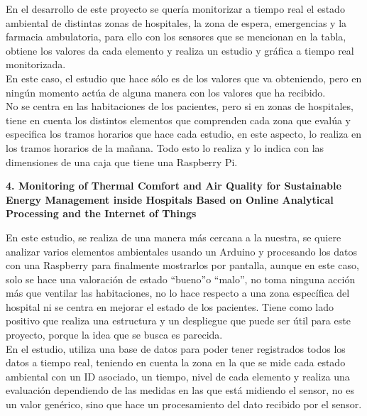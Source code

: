 En el desarrollo de este proyecto se quería monitorizar a tiempo real el estado ambiental de distintas zonas de hospitales, la zona de espera, emergencias y la farmacia ambulatoria, para ello con los sensores que se mencionan en la tabla, obtiene los valores da cada elemento y realiza un estudio y gráfica a tiempo real monitorizada. \\En este caso, el estudio que hace sólo es de los valores que va obteniendo, pero en ningún momento actúa de alguna manera con los valores que ha recibido. \\No se centra en las habitaciones de los pacientes, pero si en zonas de hospitales, tiene en cuenta los distintos elementos que comprenden cada zona que evalúa y especifica los tramos horarios que hace cada estudio, en este aspecto, lo realiza en los tramos horarios de la mañana. Todo esto lo realiza y lo indica con las dimensiones de una caja que tiene una Raspberry Pi.


\vskip 0.2in
{{\large \textbf{4. Monitoring of Thermal Comfort and Air Quality for Sustainable Energy Management inside Hospitals Based on Online Analytical Processing and the Internet of Things \cite{ijerph191912207}}}} 
\vskip 0.1in

En este estudio, se realiza de una manera más cercana a la nuestra, se quiere analizar varios elementos ambientales usando un Arduino y procesando los datos con una Raspberry para finalmente mostrarlos por pantalla, aunque en este caso, solo se hace una valoración de estado “bueno”o “malo”, no toma ninguna acción más que ventilar las habitaciones, no lo hace respecto a una zona específica del hospital ni se centra en mejorar el estado de los pacientes. Tiene como lado positivo que realiza una estructura y un despliegue que puede ser útil para este proyecto, porque la idea que se busca es parecida.\\ En el estudio, utiliza una base de datos para poder tener registrados todos los datos a tiempo real, teniendo en cuenta la zona en la que se mide cada estado ambiental con un ID asociado, un tiempo, nivel de cada elemento y realiza una evaluación dependiendo de las medidas en las que está midiendo el sensor, no es un valor genérico, sino que hace un procesamiento del dato recibido por el sensor.